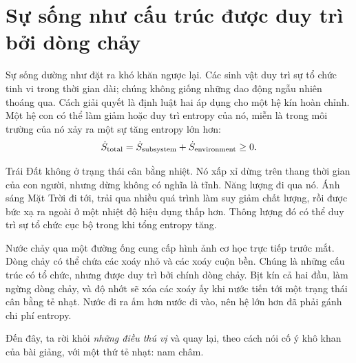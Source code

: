 \section{Sự sống như cấu trúc được duy trì bởi dòng chảy}

Sự sống dường như đặt ra khó khăn ngược lại. Các sinh vật duy trì sự tổ chức tinh vi trong thời gian dài; chúng không giống những dao động ngẫu nhiên thoáng qua. Cách giải quyết là định luật hai áp dụng cho một hệ kín hoàn chỉnh. Một hệ con có thể làm giảm hoặc duy trì entropy của nó, miễn là trong môi trường của nó xảy ra một sự tăng entropy lớn hơn:
\begin{equation}
 \dot S_{\rm total}
 =\dot S_{\rm subsystem}+\dot S_{\rm environment}\geq 0.
 \label{eq:sm8-open-system-second-law}
\end{equation}

Trái Đất không ở trạng thái cân bằng nhiệt. Nó xấp xỉ dừng trên thang thời gian của con người, nhưng dừng không có nghĩa là tĩnh. Năng lượng đi qua nó. Ánh sáng Mặt Trời đi tới, trải qua nhiều quá trình làm suy giảm chất lượng, rồi được bức xạ ra ngoài ở một nhiệt độ hiệu dụng thấp hơn. Thông lượng đó có thể duy trì sự tổ chức cục bộ trong khi tổng entropy tăng.

Nước chảy qua một đường ống cung cấp hình ảnh cơ học trực tiếp trước mắt. Dòng chảy có thể chứa các xoáy nhỏ và các xoáy cuộn bền. Chúng là những cấu trúc có tổ chức, nhưng được duy trì bởi chính dòng chảy. Bịt kín cả hai đầu, làm ngừng dòng chảy, và độ nhớt sẽ xóa các xoáy ấy khi nước tiến tới một trạng thái cân bằng tẻ nhạt. Nước đi ra ấm hơn nước đi vào, nên hệ lớn hơn đã phải gánh chi phí entropy.

\begin{classroomqa}
\end{classroomqa}

Đến đây, ta rời khỏi \emph{những điều thú vị} và quay lại, theo cách nói cố ý khô khan của bài giảng, với một thứ tẻ nhạt: nam châm.

